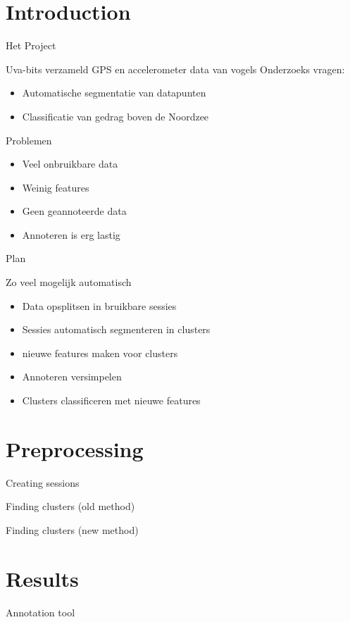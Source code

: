 \documentclass{beamer}
\title{\projectName}
\subtitle{\projectAbbreviation}
\author{Jesse Eisses, Sosha Happel, Maarten Inja and Maarten de Waard}
\institute{UvA}
\newcommand{\slide}[2]
{
\begin{frame}
\begin{block}{#1} 

#2

\end{block} \end{frame}
}
\begin{document}
\begin{frame}
\titlepage
\end{frame}



\section{Introduction}
\slide{Het Project}
{
Uva-bits verzameld GPS en accelerometer data van vogels
Onderzoeks vragen:
\begin{itemize}
	\item Automatische segmentatie van datapunten
	\item Classificatie van gedrag boven de Noordzee
\end{itemize} 
}

\slide{Problemen}
{
\begin{itemize}
	\item Veel onbruikbare data
	\item Weinig features
	\item Geen geannoteerde data
	\item Annoteren is erg lastig
\end{itemize} 
}

\slide{Plan}
{
Zo veel mogelijk automatisch
\begin{itemize}
	\item Data opsplitsen in bruikbare sessies
	\item Sessies automatisch segmenteren in clusters \item nieuwe features maken voor clusters
	\item Annoteren versimpelen
	\item Clusters classificeren met nieuwe features
\end{itemize} 
}

\section{Preprocessing}
\slide{Creating sessions}
{
    
}

\slide{Finding clusters (old method)}
{
    
}

\slide{Finding clusters (new method)}
{
    
}



\section{Results}
\slide{Annotation tool}
{
		
}
\end{document}
